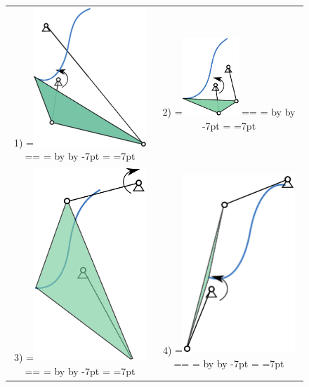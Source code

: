 \documentclass[twocolumn,10pt]{asme2e}
\makeatletter
\newcommand{\putindeepbox}[2][0.7\baselineskip]{{%
    \setbox0=\hbox{#2}%
    \setbox0=\vbox{\noindent\hsize=\wd0\unhbox0}
    \@tempdima=\dp0
    \advance\@tempdima by \ht0
    \advance\@tempdima by -#1\relax
    \dp0=\@tempdima
    \ht0=#1\relax
    \box0
}}
\makeatother
\begin{document}
\begin{figure}
\begin{tabular}{cc}
  1)\putindeepbox[7pt]{\includegraphics[width=120pt]{figure/path_solutions/path_sol1.eps}}
    & 2)\putindeepbox[7pt]{\includegraphics[width=60pt]{figure/path_solutions/path_sol2.eps}} \\
  3)\putindeepbox[7pt]{\includegraphics[width=120pt]{figure/path_solutions/path_sol3.eps}}
    & 4)\putindeepbox[7pt]{\includegraphics[width=120pt]{figure/path_solutions/path_sol4.eps}}\\

\end{tabular}
\end{figure}
\end{document}
